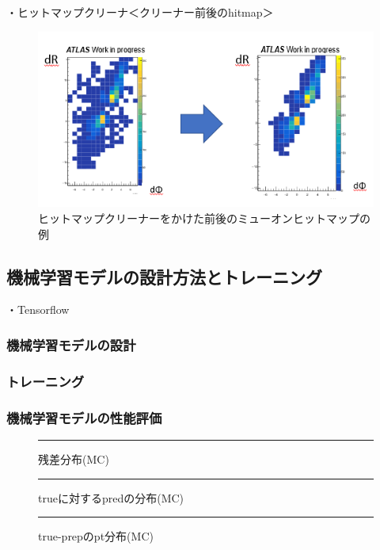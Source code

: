 ・ヒットマップクリーナ＜クリーナー前後のhitmap＞
\begin{figure}[tb]
  \centering
  \includegraphics[clip, width=14cm]{fig/4/cleaner.png}
  \caption{ヒットマップクリーナーをかけた前後のミューオンヒットマップの例}
  \label{fig:hitmapcleaner}
\end{figure}


\subsection{機械学習モデルの設計方法とトレーニング}
・Tensorflow\\
\subsubsection{機械学習モデルの設計}

\subsubsection{トレーニング}

\subsubsection{機械学習モデルの性能評価}
\begin{figure}[tb]
  \centering
  \rule{8cm}{6cm}
  \caption{残差分布(MC)}
  \label{fig:fit_def}
\end{figure}

\begin{figure}[tb]
  \centering
  \rule{8cm}{6cm}
  \caption{trueに対するpredの分布(MC)}
  \label{fig:fit_def}
\end{figure}

\begin{figure}[tb]
  \centering
  \rule{8cm}{6cm}
  \caption{true-prepのpt分布(MC)}
  \label{fig:fit_def}
\end{figure}

